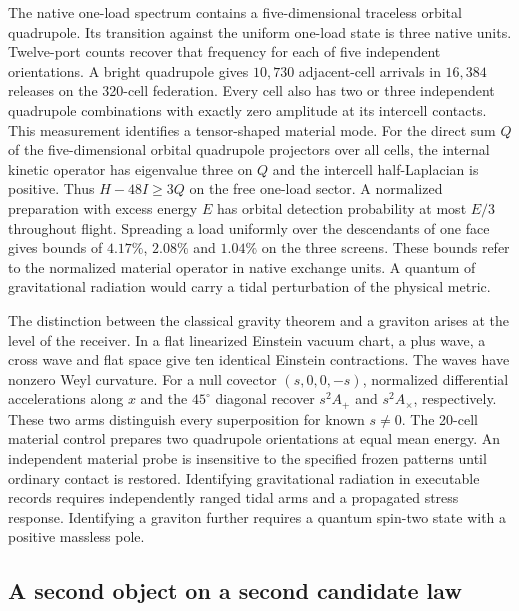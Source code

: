 The native one-load spectrum contains a five-dimensional traceless
orbital quadrupole. Its transition against the uniform one-load state is
three native units. Twelve-port counts recover that frequency for each
of five independent orientations. A bright quadrupole gives $10{,}730$
adjacent-cell arrivals in $16{,}384$ releases on the 320-cell federation.
Every cell also has two or three independent quadrupole combinations with
exactly zero amplitude at its intercell contacts. This measurement
identifies a tensor-shaped material mode. For the direct sum $Q$ of the
five-dimensional orbital quadrupole projectors over all cells, the internal
kinetic operator has eigenvalue three on $Q$ and the intercell half-Laplacian
is positive. Thus $H-48I\geq3Q$ on the free one-load sector. A normalized
preparation with excess energy $E$ has orbital detection probability at
most $E/3$ throughout flight. Spreading a load uniformly over the
descendants of one face gives bounds of $4.17\%$, $2.08\%$ and $1.04\%$
on the three screens. These bounds refer to the normalized material
operator in native exchange units. A quantum of gravitational
radiation would carry a tidal perturbation of the physical metric.

The distinction between the classical gravity theorem and a graviton
arises at the level of the receiver. In a flat linearized Einstein
vacuum chart, a plus wave, a cross wave and flat space give ten identical
Einstein contractions. The waves have nonzero Weyl curvature. For a null
covector $(s,0,0,-s)$, normalized differential accelerations along $x$ and
the $45^\circ$ diagonal recover $s^2A_+$ and $s^2A_\times$, respectively.
These two arms distinguish every superposition for known $s\ne0$.
The 20-cell material control prepares two quadrupole orientations at
equal mean energy. An independent material probe is insensitive to the
specified frozen patterns until ordinary contact is restored. Identifying
gravitational radiation in executable records requires independently
ranged tidal arms and a propagated stress response. Identifying a graviton
further requires a quantum spin-two state with a positive massless pole.

\subsection{A second object on a second candidate law}
\label{sec:cms-cage}

